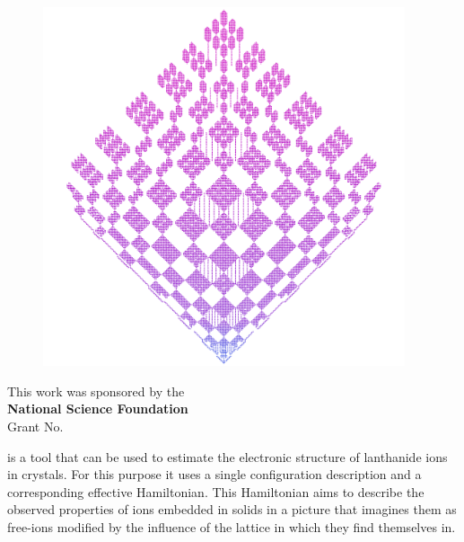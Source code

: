 \documentclass[11pt, twoside,openright]{article}
\begin{document}
\begin{center}
\vspace{-0.27cm}
\begin{figure}[h!]
	\begin{center}
		\includegraphics[width=0.95\textwidth]{nd_code.png}
	\end{center}
\end{figure}
\vspace{-0.7cm}
This work was sponsored by the \\ \textbf{National Science Foundation} \\ Grant No. 
\end{center}


\vspace*{\fill}

\cleardoublepage


\vspace*{\fill}

\qlanth is a tool that can be used to estimate the electronic structure of lanthanide ions in crystals. For this purpose it uses a single configuration description and a corresponding effective Hamiltonian. This Hamiltonian aims to describe the observed properties of ions embedded in solids in a picture that imagines them as free-ions modified by the influence of the lattice in which they find themselves in.
\end{document}
